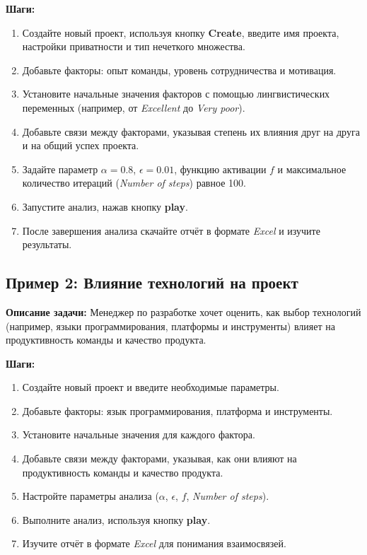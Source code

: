 \documentclass{article}
\begin{document}
    \textbf{Шаги:}
    \begin{enumerate}
        \item Создайте новый проект, используя кнопку \textbf{Create}, введите имя проекта, настройки приватности и тип нечеткого множества.
        \item Добавьте факторы: опыт команды, уровень сотрудничества и мотивация.
        \item Установите начальные значения факторов с помощью лингвистических переменных (например, от \textit{Excellent} до \textit{Very poor}).
        \item Добавьте связи между факторами, указывая степень их влияния друг на друга и на общий успех проекта.
        \item Задайте параметр $\alpha = 0.8$, $\epsilon = 0.01$, функцию активации $f$ и максимальное количество итераций (\textit{Number of steps}) равное 100.
        \item Запустите анализ, нажав кнопку \textbf{play}.
        \item После завершения анализа скачайте отчёт в формате \textit{Excel} и изучите результаты.
    \end{enumerate}

    \subsection{Пример 2: Влияние технологий на проект}

    \textbf{Описание задачи:} Менеджер по разработке хочет оценить, как выбор технологий (например, языки программирования, платформы и инструменты) влияет на продуктивность команды и качество продукта.

    \textbf{Шаги:}
    \begin{enumerate}
        \item Создайте новый проект и введите необходимые параметры.
        \item Добавьте факторы: язык программирования, платформа и инструменты.
        \item Установите начальные значения для каждого фактора.
        \item Добавьте связи между факторами, указывая, как они влияют на продуктивность команды и качество продукта.
        \item Настройте параметры анализа ($\alpha$, $\epsilon$, $f$, \textit{Number of steps}).
        \item Выполните анализ, используя кнопку \textbf{play}.
        \item Изучите отчёт в формате \textit{Excel} для понимания взаимосвязей.
    \end{enumerate}
\end{document}
